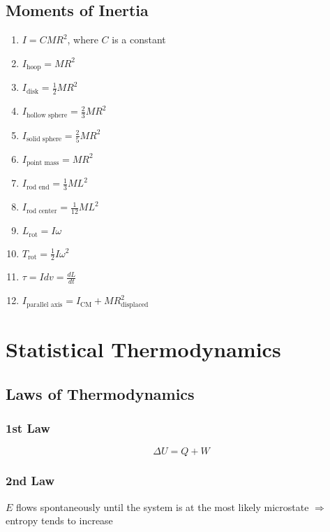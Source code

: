 \documentclass[10pt,letter]{article}
\begin{document}
\subsection{Moments of Inertia}
\begin{enumerate}
    \item $I = CMR^2$, where $C$ is a constant
    \item $I_{\textrm{hoop}} = MR^2$ 
    \item $I_{\textrm{disk}} = \frac{1}{2} MR^2$
    \item $I_{\textrm{hollow sphere}} = \frac{2}{3}MR^2$
    \item $I_{\textrm{solid sphere}} = \frac{2}{5}MR^2$
    \item $I_{\textrm{point mass}} = MR^2$
    \item $I_{\textrm{rod end}} = \frac{1}{3}ML^2$
    \item $I_{\textrm{rod center}} = \frac{1}{12} ML^2$
    \item $L_{\textrm{rot}} = I\omega$
    \item $T_{\textrm{rot}} = \frac{1}{2}I\omega^2$
    \item $\tau = I dv = \frac{dL}{dt}$
    \item $I_{\textrm{parallel axis}} = I_{\textrm{CM}} + MR_{\textrm{displaced}}^2$
\end{enumerate}



\section{Statistical Thermodynamics}
\subsection{Laws of Thermodynamics}
\subsubsection{1st Law}
\begin{equation}
 \Delta U = Q + W
\end{equation}

\subsubsection{2nd Law}
$E$ flows spontaneously until the system is at the most likely microstate $\Rightarrow$ entropy tends to increase
\end{document}
